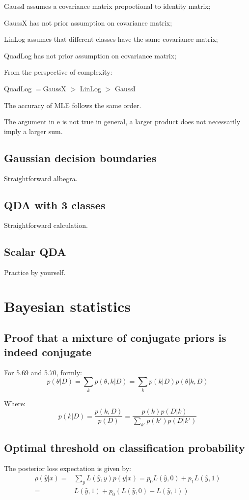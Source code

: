 \documentclass[UTF8]{ctexart}
\begin{document}
GaussI assumes a covariance matrix propoetional to identity matrix;

GaussX has not prior assumption on covariance matrix;

LinLog assumes that different classes have the same covariance matrix;

QuadLog has not prior assumption on covariance matrix;

From the perspective of complexity:

QuadLog $=$GaussX $>$ LinLog $>$ GaussI

The accuracy of MLE follows the same order.

The argument in e is not true in general, a larger product does not necessarily imply a larger sum.

\subsection{Gaussian decision boundaries}
Straightforward albegra.

\subsection{QDA with 3 classes}
Straightforward calculation.

\subsection{Scalar QDA}
Practice by yourself.

\newpage
\section{Bayesian statistics}
\subsection{Proof that a mixture of conjugate priors is indeed conjugate}
For 5.69 and 5.70, formly:
$$p(\theta|D)=\sum_{k}p(\theta,k|D)=\sum_{k}p(k|D)p(\theta|k,D)$$

Where:
$$p(k|D)=\frac{p(k,D)}{p(D)}=\frac{p(k)p(D|k)}{\sum_{k'}p(k')p(D|k')}$$

\subsection{Optimal threshold on classification probability}
The posterior loss expectation is given by:
\begin{align}
\rho(\hat{y}|x)=&\sum_{y}L(\hat{y},y)p(y|x)=p_{0}L(\hat{y},0)+p_{1}L(\hat{y},1)\nonumber \\
=&L(\hat{y},1)+p_{0}(L(\hat{y},0)-L(\hat{y},1))\nonumber 
\end{align}
\end{document}
